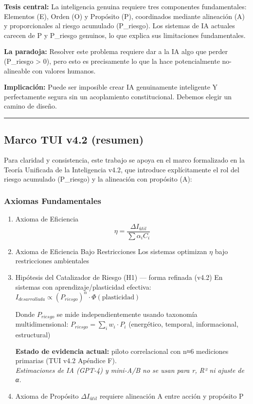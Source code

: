 \textbf{Tesis central:} La inteligencia genuina requiere tres
componentes fundamentales: Elementos (E), Orden (O) y Propósito (P),
coordinados mediante alineación (A) y proporcionales al riesgo acumulado
(P\_riesgo). Los sistemas de IA actuales carecen de P y P\_riesgo
genuinos, lo que explica sus limitaciones fundamentales.

\textbf{La paradoja:} Resolver este problema requiere dar a la IA algo
que perder (P\_riesgo \textgreater{} 0), pero esto es precisamente lo
que la hace potencialmente no-alineable con valores humanos.

\textbf{Implicación:} Puede ser imposible crear IA genuinamente
inteligente Y perfectamente segura sin un acoplamiento constitucional.
Debemos elegir un camino de diseño.

\begin{center}\rule{0.5\linewidth}{0.5pt}\end{center}

\subsection{Marco TUI v4.2 (resumen)}\label{marco-tui-v4.2-resumen}

Para claridad y consistencia, este trabajo se apoya en el marco
formalizado en la Teoría Unificada de la Inteligencia v4.2, que
introduce explícitamente el rol del riesgo acumulado (P\_riesgo) y la
alineación con propósito (A):

\subsubsection{Axiomas Fundamentales}\label{axiomas-fundamentales}

\begin{enumerate}
\def\labelenumi{\arabic{enumi}.}
\item
  Axioma de Eficiencia
  \[ \eta = \frac{\Delta I_{útil}}{\sum \alpha_i C_i} \]
\item
  Axioma de Eficiencia Bajo Restricciones Los sistemas optimizan
  \(\eta\) bajo restricciones ambientales
\item
  Hipótesis del Catalizador de Riesgo (H1) --- forma refinada (v4.2) En
  sistemas con aprendizaje/plasticidad efectiva:
  \(I_{desarrollada} \propto (P_{riesgo})^\alpha \cdot \Phi(\text{plasticidad})\)

  Donde \(P_{riesgo}\) se mide independientemente usando taxonomía
  multidimensional: \(P_{riesgo} = \sum_i w_i \cdot P_i\) (energético,
  temporal, informacional, estructural)

  \textbf{Estado de evidencia actual:} piloto correlacional con n≈6
  mediciones primarias (TUI v4.2 Apéndice F).\\
  \emph{Estimaciones de IA (GPT-4) y mini-A/B no se usan para r, R² ni
  ajuste de α.}
\item
  Axioma de Propósito \(ΔI_{útil}\) requiere alineación A entre acción y
  propósito P
\end{enumerate}

